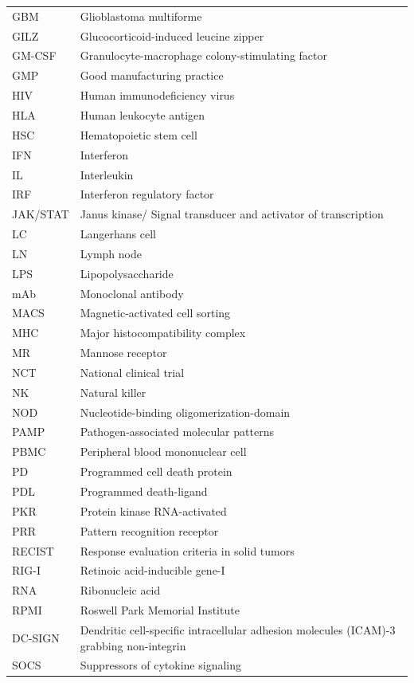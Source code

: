 \documentclass[
]{article}
\begin{document}
\begin{longtable}[]{@{}
  >{\raggedright\arraybackslash}p{}
  >{\raggedright\arraybackslash}p{}@{}}
GBM & Glioblastoma multiforme \\
GILZ & Glucocorticoid-induced leucine zipper \\
GM-CSF & Granulocyte-macrophage colony-stimulating factor \\
GMP & Good manufacturing practice \\
HIV & Human immunodeficiency virus \\
HLA & Human leukocyte antigen \\
HSC & Hematopoietic stem cell \\
IFN & Interferon \\
IL & Interleukin \\
IRF & Interferon regulatory factor \\
JAK/STAT & Janus kinase/ Signal transducer and activator of
transcription \\
LC & Langerhans cell \\
LN & Lymph node \\
LPS & Lipopolysaccharide \\
mAb & Monoclonal antibody \\
MACS & Magnetic-activated cell sorting \\
MHC & Major histocompatibility complex \\
MR & Mannose receptor \\
NCT & National clinical trial \\
NK & Natural killer \\
NOD & Nucleotide-binding oligomerization-domain \\
PAMP & Pathogen-associated molecular patterns \\
PBMC & Peripheral blood mononuclear cell \\
PD & Programmed cell death protein \\
PDL & Programmed death-ligand \\
PKR & Protein kinase RNA-activated \\
PRR & Pattern recognition receptor \\
RECIST & Response evaluation criteria in solid tumors \\
RIG-I & Retinoic acid-inducible gene-I \\
RNA & Ribonucleic acid \\
RPMI & Roswell Park Memorial Institute \\
DC-SIGN & Dendritic cell-specific intracellular adhesion molecules
(ICAM)-3 grabbing non-integrin \\
SOCS & Suppressors of cytokine signaling \\

\end{longtable}
\end{document}
